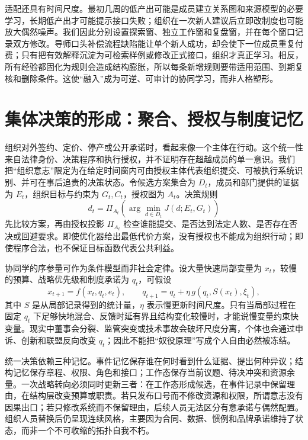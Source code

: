 适配还具有时间尺度。最初几周的低产出可能是成员建立关系图和来源模型的必要学习，长期低产出才可能提示接口失败；组织在一次新人建议后立即改制度也可能放大偶然噪声。我们因此分别设置探索窗、独立工作窗和复盘窗，并在每个窗口记录双方修改。导师口头补偿流程缺陷能让单个新人成功，却会使下一位成员重复付费；只有把有效解释沉淀为可检索样例或修改正式接口，组织才真正学习。相反，所有经验都固化为规则会造成结构膨胀，所以每条新增规则要带适用范围、到期复核和删除条件。这使“融入”成为可逆、可审计的协同学习，而非人格塑形。

\section{集体决策的形成：聚合、授权与制度记忆}
\label{sec:emergence_of_organizational_will}

组织对外签约、定价、停产或公开承诺时，看起来像一个主体在行动。这个统一性来自法律身份、决策程序和执行授权，并不证明存在超越成员的单一意识。我们把“组织意志”限定为在给定时间窗内可由授权主体代表组织提交、可被执行系统识别、并可在事后追责的决策状态。令候选方案集合为 $D_t$，成员和部门提供的证据为 $E_t$，组织目标与约束为 $G_t,C_t$，授权图为 $A_t$。决策规则
\begin{equation}
 d_t=\Pi_{A_t}\!\left(\arg\min_{d\in D_t}J(d;E_t,G_t)\right)
\end{equation}
先比较方案，再由授权投影 $\Pi_{A_t}$ 检查谁能提交、是否达到法定人数、是否存在否决或回避要求。即使优化器给出最低代价方案，没有授权也不能成为组织行动；即使程序合法，也不保证目标函数代表公共利益。

协同学的序参量可作为条件模型而非社会定律。设大量快速局部变量为 $x_t$，较慢的预算、战略优先级和制度承诺为 $q_t$，可假设
\begin{equation}
 x_{t+1}=f(x_t,q_t,e_t),\qquad q_{t+1}=q_t+\eta\,g(q_t,S(x_t),\xi_t),
\end{equation}
其中 $S$ 是从局部记录得到的统计量，$\eta$ 表示慢更新时间尺度。只有当局部过程在固定 $q_t$ 下足够快地混合、反馈时延有界且结构变化较慢时，才能说慢变量约束快变量。现实中董事会分裂、监管突变或技术事故会破坏尺度分离，个体也会通过申诉、创新和联盟反向改变 $q_t$；因此不能把“奴役原理”写成个人自由必然被冻结。

统一决策依赖三种记忆。事件记忆保存谁在何时看到什么证据、提出何种异议；结构记忆保存章程、权限、角色和接口；工作态保存当前议题、待决冲突和资源余量。一次战略转向必须同时更新三者：在工作态形成候选，在事件记录中保留理由，在结构层改变预算或职责。若只发布口号而不修改资源和权限，所谓意志没有因果出口；若只修改系统而不保留理由，后续人员无法区分有意承诺与偶然配置。组织人员替换后仍呈现连续风格，主要因为合同、数据、惯例和品牌承诺维持了状态，而非一个不可收缩的拓扑自我不朽。

